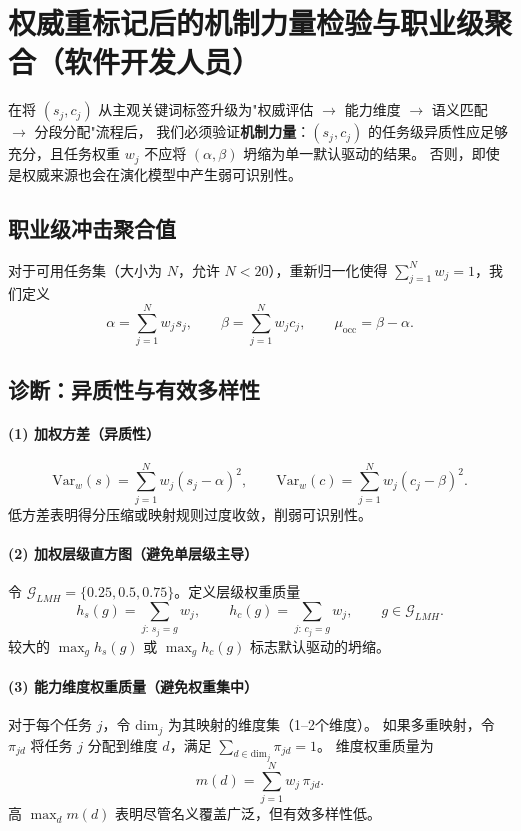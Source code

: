 \section{权威重标记后的机制力量检验与职业级聚合（软件开发人员）}

在将 $(s_j,c_j)$ 从主观关键词标签升级为"权威评估 $\rightarrow$ 能力维度 $\rightarrow$ 语义匹配 $\rightarrow$ 分段分配"流程后，
我们必须验证\textbf{机制力量}：$(s_j,c_j)$ 的任务级异质性应足够充分，且任务权重 $w_j$ 不应将 $(\alpha,\beta)$ 坍缩为单一默认驱动的结果。
否则，即使是权威来源也会在演化模型中产生弱可识别性。

\subsection{职业级冲击聚合值}

对于可用任务集（大小为 $N$，允许 $N<20$），重新归一化使得 $\sum_{j=1}^{N} w_j=1$，我们定义
\begin{equation}
    \alpha=\sum_{j=1}^{N} w_j s_j,\qquad
    \beta=\sum_{j=1}^{N} w_j c_j,\qquad
    \mu_{\mathrm{occ}}=\beta-\alpha.
\end{equation}

\subsection{诊断：异质性与有效多样性}

\paragraph{(1) 加权方差（异质性）}
\begin{equation}
    \mathrm{Var}_w(s)=\sum_{j=1}^{N} w_j (s_j-\alpha)^2,\qquad
    \mathrm{Var}_w(c)=\sum_{j=1}^{N} w_j (c_j-\beta)^2.
\end{equation}
低方差表明得分压缩或映射规则过度收敛，削弱可识别性。

\paragraph{(2) 加权层级直方图（避免单层级主导）}
令 $\mathcal{G}_{LMH}=\{0.25,0.5,0.75\}$。定义层级权重质量
\begin{equation}
    h_s(g)=\sum_{j:\,s_j=g} w_j,\qquad
    h_c(g)=\sum_{j:\,c_j=g} w_j,\qquad g\in\mathcal{G}_{LMH}.
\end{equation}
较大的 $\max_g h_s(g)$ 或 $\max_g h_c(g)$ 标志默认驱动的坍缩。

\paragraph{(3) 能力维度权重质量（避免权重集中）}
对于每个任务 $j$，令 $\mathrm{dim}_j$ 为其映射的维度集（1--2个维度）。
如果多重映射，令 $\pi_{j d}$ 将任务 $j$ 分配到维度 $d$，满足 $\sum_{d\in\mathrm{dim}_j}\pi_{j d}=1$。
维度权重质量为
\begin{equation}
    m(d)=\sum_{j=1}^{N} w_j\,\pi_{j d}.
\end{equation}
高 $\max_d m(d)$ 表明尽管名义覆盖广泛，但有效多样性低。

